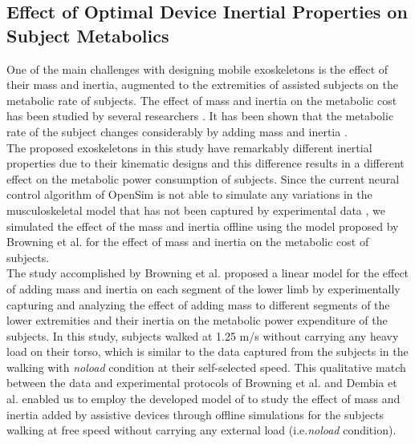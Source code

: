 \documentclass[10pt,letterpaper]{article}
\begin{document}
\subsection*{Effect of Optimal Device Inertial Properties on Subject Metabolics}
One of the main challenges with designing mobile exoskeletons is the effect of their mass and inertia, augmented to the extremities of assisted subjects on the metabolic rate of subjects. The effect of mass and inertia on the metabolic cost has been studied by several researchers \cite{133,134}. It has been shown that the metabolic rate of the subject changes considerably by adding mass and inertia \cite{133,134,135}.\\
The proposed exoskeletons in this study have remarkably different inertial properties due to their kinematic designs and this difference results in a different effect on the metabolic power consumption of subjects. Since the current neural control algorithm of OpenSim is not able to simulate any variations in the musculoskeletal model that has not been captured by experimental data \cite{92}, we simulated the effect of the mass and inertia offline using the model proposed by Browning et al.\cite{133} for the effect of mass and inertia on the metabolic cost of subjects.\\
The study accomplished by Browning et al.\cite{133} proposed a linear model for the effect of adding mass and inertia on each segment of the lower limb by experimentally capturing and analyzing the effect of adding mass to different segments of the lower extremities and their inertia on the metabolic power expenditure of the subjects. In this study, subjects walked at 1.25 m/s without carrying any heavy load on their torso, which is similar to the data captured from the subjects in the walking with \textit{noload} condition at their self-selected speed\cite{93}. This qualitative match between the data and experimental protocols of Browning et al. and Dembia et al. enabled us to employ the developed model of \cite{133} to study the effect of mass and inertia added by assistive devices through offline simulations for the subjects walking at free speed without carrying any external load (i.e.{\it noload} condition).\\
\end{document}
